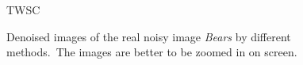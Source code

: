 \begin{figure}[t!]
{\begin{minipage}[t]{0.24\textwidth}
{\footnotesize TWSC}
\end{minipage}
}\vspace{-3mm}
    \caption{Denoised images of the real noisy image \textsl{Bears} \cite{ncwebsite} by different methods.\ The images are better to be zoomed in on screen.}
    \label{fig5-8}
\end{figure}


\begin{figure}[t!]
    \centering
{}
\end{figure}
